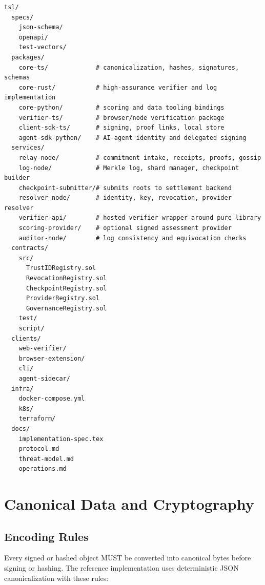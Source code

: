 \documentclass[11pt]{article}
\begin{document}
\begin{lstlisting}[style=tslcode]
tsl/
  specs/
    json-schema/
    openapi/
    test-vectors/
  packages/
    core-ts/             # canonicalization, hashes, signatures, schemas
    core-rust/           # high-assurance verifier and log implementation
    core-python/         # scoring and data tooling bindings
    verifier-ts/         # browser/node verification package
    client-sdk-ts/       # signing, proof links, local store
    agent-sdk-python/    # AI-agent identity and delegated signing
  services/
    relay-node/          # commitment intake, receipts, proofs, gossip
    log-node/            # Merkle log, shard manager, checkpoint builder
    checkpoint-submitter/# submits roots to settlement backend
    resolver-node/       # identity, key, revocation, provider resolver
    verifier-api/        # hosted verifier wrapper around pure library
    scoring-provider/    # optional signed assessment provider
    auditor-node/        # log consistency and equivocation checks
  contracts/
    src/
      TrustIDRegistry.sol
      RevocationRegistry.sol
      CheckpointRegistry.sol
      ProviderRegistry.sol
      GovernanceRegistry.sol
    test/
    script/
  clients/
    web-verifier/
    browser-extension/
    cli/
    agent-sidecar/
  infra/
    docker-compose.yml
    k8s/
    terraform/
  docs/
    implementation-spec.tex
    protocol.md
    threat-model.md
    operations.md
\end{lstlisting}

\section{Canonical Data and Cryptography}

\subsection{Encoding Rules}

Every signed or hashed object MUST be converted into canonical bytes before signing or hashing. The reference implementation uses deterministic JSON canonicalization with these rules:
\end{document}
